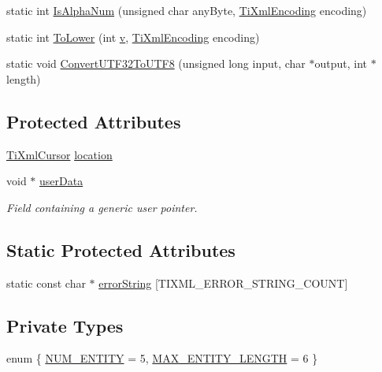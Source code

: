 \begin{DoxyCompactItemize}
\item 
static int \hyperlink{class_ti_xml_base_a321919055c115c78ded17f85a793f368}{IsAlphaNum} (unsigned char anyByte, \hyperlink{tinyxml_8h_a88d51847a13ee0f4b4d320d03d2c4d96}{TiXmlEncoding} encoding)
\item 
static int \hyperlink{class_ti_xml_base_a799f17405a86a5c2029618e85f11a097}{ToLower} (int \hyperlink{_multi_view_8cpp_a8320ee13ac034dbf6d624fe8953dd337}{v}, \hyperlink{tinyxml_8h_a88d51847a13ee0f4b4d320d03d2c4d96}{TiXmlEncoding} encoding)
\item 
static void \hyperlink{class_ti_xml_base_a07c765e3a7f979d343e646ea797b180b}{ConvertUTF32ToUTF8} (unsigned long input, char $\ast$output, int $\ast$length)
\end{DoxyCompactItemize}
\subsection*{Protected Attributes}
\begin{DoxyCompactItemize}
\item 
\hyperlink{struct_ti_xml_cursor}{TiXmlCursor} \hyperlink{class_ti_xml_base_a0d992580f3bc264909f898e942677a3c}{location}
\item 
void $\ast$ \hyperlink{class_ti_xml_base_ab242c01590191f644569fa89a080d97c}{userData}
\begin{DoxyCompactList}\small\item\em Field containing a generic user pointer. \item\end{DoxyCompactList}\end{DoxyCompactItemize}
\subsection*{Static Protected Attributes}
\begin{DoxyCompactItemize}
\item 
static const char $\ast$ \hyperlink{class_ti_xml_base_a7ac8feec4100e446b3d78e1ac0659700}{errorString} \mbox{[}TIXML\_\-ERROR\_\-STRING\_\-COUNT\mbox{]}
\end{DoxyCompactItemize}
\subsection*{Private Types}
\begin{DoxyCompactItemize}
\item 
enum \{ \hyperlink{class_ti_xml_base_a99a2fe4c7ab51f1be33d349c5fd382e8ab848893c6d03fcd8f42941d7079ccb47}{NUM\_\-ENTITY} =  5, 
\hyperlink{class_ti_xml_base_a99a2fe4c7ab51f1be33d349c5fd382e8aeb571e41586d47e28f60445cb9b41d49}{MAX\_\-ENTITY\_\-LENGTH} =  6
 \}
\end{DoxyCompactItemize}
